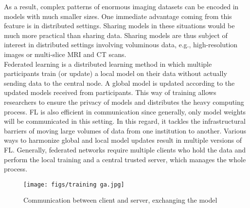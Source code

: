 As a result, complex patterns of enormous imaging datasets can be encoded in models with much smaller sizes. One immediate advantage coming from this feature is in distributed settings. Sharing models in these situations would be much more practical than sharing data. Sharing models are thus subject of interest in distributed settings involving voluminous data, e.g., high-resolution images or multi-slice MRI and CT scans.  \\

Federated learning is a distributed learning method in which multiple participants train (or update) a local model on their data without actually sending data to the central node. A global model is updated according to the updated models received from participants. This way of training allows researchers to ensure the privacy of models and distributes the heavy computing process. FL is also efficient in communication since generally, only model weights will be communicated in this setting. In this regard, it tackles the infrastructural barriers of moving large volumes of data from one institution to another. Various ways to harmonize global and local model updates result in multiple versions of FL. Generally, federated networks require multiple clients who hold the data and perform the local training and a central trusted server, which manages the whole process. \\

\begin{figure}[h!]
 \centering
  \texttt{[image: figs/training ga.jpg]}
  \caption{Communication between client and server, exchanging the model}
 \label{fig:train1}
\end{figure}


